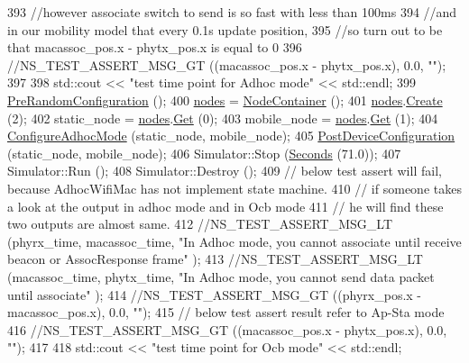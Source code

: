 \begin{DoxyCode}
393   \textcolor{comment}{//however associate switch to send is so fast with less than 100ms}
394   \textcolor{comment}{//and in our mobility model that every 0.1s update position,}
395   \textcolor{comment}{//so turn out to be that macassoc\_pos.x - phytx\_pos.x is equal to 0}
396   \textcolor{comment}{//NS\_TEST\_ASSERT\_MSG\_GT ((macassoc\_pos.x - phytx\_pos.x), 0.0, "");}
397 
398   std::cout << \textcolor{stringliteral}{"test time point for Adhoc mode"} << std::endl;
399   \hyperlink{classOcbWifiMacTestCase_a8d3d662e40832ac05a5be6b7061671e9}{PreRandomConfiguration} ();
400   \hyperlink{classOcbWifiMacTestCase_ae01930c670f59939ba7678a09302774f}{nodes} = \hyperlink{classns3_1_1NodeContainer}{NodeContainer} ();
401   \hyperlink{classOcbWifiMacTestCase_ae01930c670f59939ba7678a09302774f}{nodes}.\hyperlink{classns3_1_1NodeContainer_a787f059e2813e8b951cc6914d11dfe69}{Create} (2);
402   static\_node = \hyperlink{classOcbWifiMacTestCase_ae01930c670f59939ba7678a09302774f}{nodes}.\hyperlink{classns3_1_1NodeContainer_a9ed96e2ecc22e0f5a3d4842eb9bf90bf}{Get} (0);
403   mobile\_node = \hyperlink{classOcbWifiMacTestCase_ae01930c670f59939ba7678a09302774f}{nodes}.\hyperlink{classns3_1_1NodeContainer_a9ed96e2ecc22e0f5a3d4842eb9bf90bf}{Get} (1);
404   \hyperlink{classOcbWifiMacTestCase_ab3c7899bb00af1e0ad1897f9ae74cdd0}{ConfigureAdhocMode} (static\_node, mobile\_node);
405   \hyperlink{classOcbWifiMacTestCase_a6b536e2fc476ebf85d4cd0ae7490987c}{PostDeviceConfiguration} (static\_node, mobile\_node);
406   Simulator::Stop (\hyperlink{group__timecivil_ga33c34b816f8ff6628e33d5c8e9713b9e}{Seconds} (71.0));
407   Simulator::Run ();
408   Simulator::Destroy ();
409   \textcolor{comment}{// below test assert will fail, because AdhocWifiMac has not implement state machine.}
410   \textcolor{comment}{// if someone takes a look at the output in adhoc mode and in Ocb mode}
411   \textcolor{comment}{// he will find these two outputs are almost same.}
412   \textcolor{comment}{//NS\_TEST\_ASSERT\_MSG\_LT (phyrx\_time, macassoc\_time, "In Adhoc mode, you cannot associate until receive
       beacon or AssocResponse frame" );}
413   \textcolor{comment}{//NS\_TEST\_ASSERT\_MSG\_LT (macassoc\_time, phytx\_time, "In Adhoc mode,  you cannot send data packet until
       associate" );}
414   \textcolor{comment}{//NS\_TEST\_ASSERT\_MSG\_GT ((phyrx\_pos.x - macassoc\_pos.x), 0.0, "");}
415   \textcolor{comment}{// below test assert result refer to Ap-Sta mode}
416   \textcolor{comment}{//NS\_TEST\_ASSERT\_MSG\_GT ((macassoc\_pos.x - phytx\_pos.x), 0.0, "");}
417 
418   std::cout << \textcolor{stringliteral}{"test time point for Ocb mode"} << std::endl;

\end{DoxyCode}
